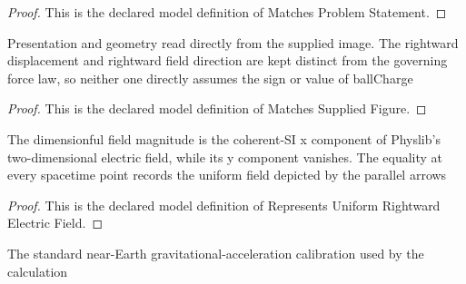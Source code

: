 \begin{proof}
  This is the declared model definition of Matches Problem Statement.
\end{proof}
\begin{definition}
  \label{def:physics:phyx-mini-0904:phyxminiproblems-problemphyxmini0904-matchessuppliedfigure}
  Presentation and geometry read directly from the supplied image. The rightward displacement and rightward field direction are kept distinct from the governing force law, so neither one directly assumes the sign or value of ballCharge
\end{definition}
\begin{proof}
  This is the declared model definition of Matches Supplied Figure.
\end{proof}
\begin{definition}
  \label{def:physics:phyx-mini-0904:phyxminiproblems-problemphyxmini0904-representsuniformrightwardelectricfield}
  The dimensionful field magnitude is the coherent-SI x component of Physlib's two-dimensional electric field, while its y component vanishes. The equality at every spacetime point records the uniform field depicted by the parallel arrows
\end{definition}
\begin{proof}
  This is the declared model definition of Represents Uniform Rightward Electric Field.
\end{proof}
\begin{definition}
  \label{def:physics:phyx-mini-0904:phyxminiproblems-problemphyxmini0904-usesstandardnearearthgravity}
  The standard near-Earth gravitational-acceleration calibration used by the calculation
\end{definition}
